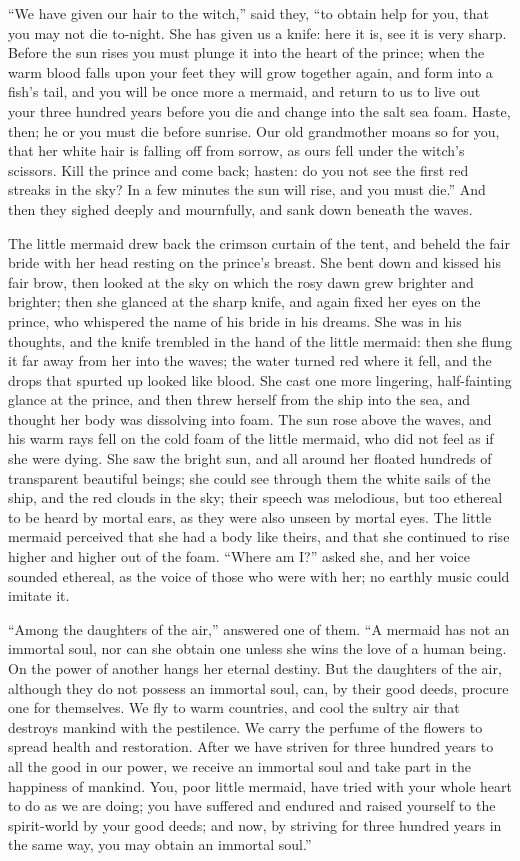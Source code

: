 ``We have given our hair to the witch,'' said they, ``to obtain help for you, that you may not die to-night.
She has given us a knife: here it is, see it is very sharp.
Before the sun rises you must plunge it into the heart of the prince; when the warm blood falls upon your feet they will grow together again, and form into a fish’s tail, and you will be once more a mermaid, and return to us to live out your three hundred years before you die and change into the salt sea foam.
Haste, then; he or you must die before sunrise.
Our old grandmother moans so for you, that her white hair is falling off from sorrow, as ours fell under the witch’s scissors.
Kill the prince and come back; hasten: do you not see the first red streaks in the sky? In a few minutes the sun will rise, and you must die.'' And then they sighed deeply and mournfully, and sank down beneath the waves.

The little mermaid drew back the crimson curtain of the tent, and beheld the fair bride with her head resting on the prince’s breast.
She bent down and kissed his fair brow, then looked at the sky on which the rosy dawn grew brighter and brighter; then she glanced at the sharp knife, and again fixed her eyes on the prince, who whispered the name of his bride in his dreams.
She was in his thoughts, and the knife trembled in the hand of the little mermaid: then she flung it far away from her into the waves; the water turned red where it fell, and the drops that spurted up looked like blood.
She cast one more lingering, half-fainting glance at the prince, and then threw herself from the ship into the sea, and thought her body was dissolving into foam.
The sun rose above the waves, and his warm rays fell on the cold foam of the little mermaid, who did not feel as if she were dying.
She saw the bright sun, and all around her floated hundreds of transparent beautiful beings; she could see through them the white sails of the ship, and the red clouds in the sky; their speech was melodious, but too ethereal to be heard by mortal ears, as they were also unseen by mortal eyes.
The little mermaid perceived that she had a body like theirs, and that she continued to rise higher and higher out of the foam.
``Where am I?'' asked she, and her voice sounded ethereal, as the voice of those who were with her; no earthly music could imitate it.

``Among the daughters of the air,'' answered one of them.
``A mermaid has not an immortal soul, nor can she obtain one unless she wins the love of a human being.
On the power of another hangs her eternal destiny.
But the daughters of the air, although they do not possess an immortal soul, can, by their good deeds, procure one for themselves.
We fly to warm countries, and cool the sultry air that destroys mankind with the pestilence.
We carry the perfume of the flowers to spread health and restoration.
After we have striven for three hundred years to all the good in our power, we receive an immortal soul and take part in the happiness of mankind.
You, poor little mermaid, have tried with your whole heart to do as we are doing; you have suffered and endured and raised yourself to the spirit-world by your good deeds; and now, by striving for three hundred years in the same way, you may obtain an immortal soul.''

